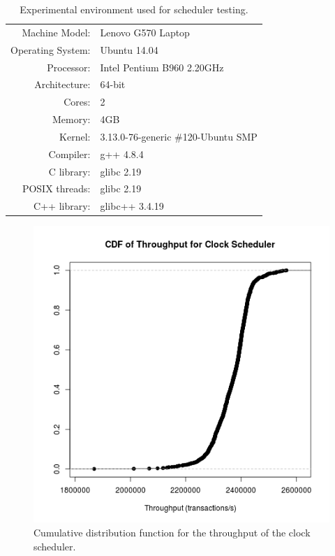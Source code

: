 \begin{table}
\center
\begin{tabular}{rl}
Machine Model:    & Lenovo G570 Laptop \\
Operating System: & Ubuntu 14.04 \\
Processor:        & Intel Pentium B960 2.20GHz \\
Architecture:     & 64-bit \\
Cores:            & 2 \\
Memory:           & 4GB \\
Kernel:           & 3.13.0-76-generic \#120-Ubuntu SMP \\
Compiler:         & g++ 4.8.4 \\
C library:        & glibc 2.19 \\
POSIX threads:    & glibc 2.19 \\
C++ library:      & glibc++ 3.4.19 \\
\end{tabular}
\caption{Experimental environment used for scheduler testing.\label{environment}}
\end{table}

\begin{figure}
\center
\includegraphics[width=\textwidth]{clock_throughput_cdf.png}
\caption{Cumulative distribution function for the throughput of the clock scheduler. \label{clock_throughput}}
\end{figure}

